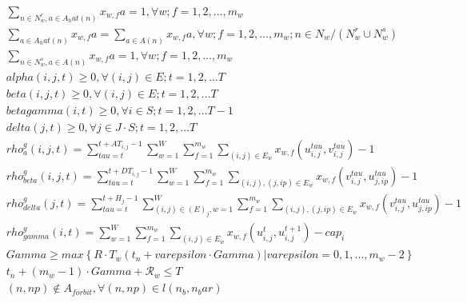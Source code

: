 \begin{align}
  & \sum_{n \in N_{w}^{r}, a \in A_hat \left(n\right)} x_{w , f} a = 1 , \forall w ; f = 1 , 2 , \hdots , m_{w} \tag{eq\_0017} \\
  & \sum_{a \in A_hat \left(n\right)} x_{w , f} a = \sum_{a \in {A} \left(n\right)} x_{w , f} a , \forall w ; f = 1 , 2 , \hdots , m_{w} ; n \in N_{w} / \left(N_{w}^{r} \cup N_{w}^{s}\right) \tag{eq\_0018} \\
  & \sum_{n \in N_{w}^{s}, a \in {A} \left(n\right)} x_{w , f} a = 1 , \forall w ; f = 1 , 2 , \hdots , m_{w} \tag{eq\_0019} \\
  & \mathit{alpha} \left(i , j , t\right) \geq 0 , \forall \left(i , j\right) \in E ; t = 1 , 2 , \hdots T \tag{eq\_0025} \\
  & \mathit{beta} \left(i , j , t\right) \geq 0 , \forall \left(i , j\right) \in E ; t = 1 , 2 , \hdots T \tag{eq\_0026} \\
  & \mathit{beta} \mathit{gamma} \left(i , t\right) \geq 0 , \forall i \in S ; t = 1 , 2 , \hdots T - 1 \tag{eq\_0027} \\
  & \mathit{delta} \left(j , t\right) \geq 0 , \forall j \in J \cdot S ; t = 1 , 2 , \hdots T \tag{eq\_0028} \\
  & \mathit{rho}_{a}^{g} \left(i , j , t\right) = \sum_{\mathit{tau} = t}^{t + A T_{i , j} - 1} \sum_{w = 1}^{W} \sum_{f = 1}^{m_{w}} \sum_{\left(i , j\right) \in E_{w}} x_{w , f} \left(u_{i , j}^{\mathit{tau}} , v_{i , j}^{\mathit{tau}}\right) - 1 \tag{eq\_0029} \\
  & \mathit{rho}_{\mathit{beta}}^{g} \left(i , j , t\right) = \sum_{\mathit{tau} = t}^{t + D T_{i , j} - 1} \sum_{w = 1}^{W} \sum_{f = 1}^{m_{w}} \sum_{\left(i , j\right) , \left(j , ip\right) \in E_{w}} x_{w , f} \left(v_{i , j}^{\mathit{tau}} , u_{j , ip}^{\mathit{tau}}\right) - 1 \tag{eq\_0030} \\
  & \mathit{rho}_{\mathit{delta}}^{g} \left(j , t\right) = \sum_{\mathit{tau} = t}^{t + H_{j} - 1} \sum_{\left(i , j\right) \in \left({E}\right)_{j}, w = 1} ^{W} \sum_{f = 1}^{m_{w}} \sum_{\left(i , j\right) , \left(j , ip\right) \in E_{w}} x_{w , f} \left(v_{i , j}^{\mathit{tau}} , u_{j , ip}^{\mathit{tau}}\right) - 1 \tag{eq\_0031} \\
  & \mathit{rho}_{\mathit{gamma}}^{g} \left(i , t\right) = \sum_{w = 1}^{W} \sum_{f = 1}^{m_{w}} \sum_{\left(i , j\right) \in E_{w}} x_{w , f} \left(u_{i , j}^{t} , u_{i , j}^{t + 1}\right) - \mathit{cap}_{i} \tag{eq\_0032} \\
  & \mathit{Gamma} \geq m a x \left\{R \cdot T_{w} \left(t_{n} + \mathit{varepsilon} \cdot \mathit{Gamma}\right) \left|\right. \mathit{varepsilon} = 0 , 1 , \hdots , m_{w} - 2\right\} \tag{eq\_0038} \\
  & t_{n} + \left(m_{w} - 1\right) \cdot \mathit{Gamma} + \mathcal{R}_{w} \leq T \tag{eq\_0039} \\
  & \left(n , np\right) \notin A_{f o r b i t} , \forall \left(n , np\right) \in l \left(n_{b} , n_bar\right) \tag{eq\_0041} \\
\end{align}
